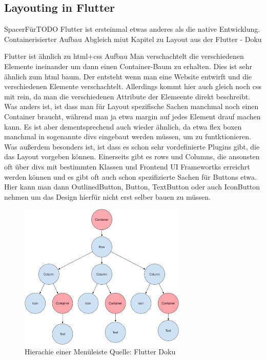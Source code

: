 \subsection{Layouting in Flutter}
SpacerFürTODO
Flutter ist ersteinmal etwas anderes als die native Entwicklung. 
Containerisierter Aufbau Abgleich miut Kapitel zu Layout aus der Flutter - Doku

Flutter ist ähnlich zu html+css Aufbau Man verschachtelt die verschiedenen Elemente ineinander um dann einen Container-Baum zu erhalten.
Dies ist sehr ähnlich zum html baum. Der entsteht wenn man eine Website entwirft und die verschiedenen Elemente verschachtelt. 
Allerdings kommt hier auch gleich noch css mit rein, da man die verschiedenen Attribute der Elemeente direkt beschreibt.
Was anders ist, ist dass man für Layout spezifische Sachen manchmal noch einen Container braucht, während man ja etwa margin auf jedes Element drauf machen kann. Es ist aber dementsprechend auch wieder ähnlich, da etwa flex boxen manchmal in sogenannte divs eingebaut werden müssen, um zu funtktionieren. Was außerdem besonders ist, ist dass es schon sehr vordefinierte Plugins gibt, die das Layout vorgeben können. Einerseits gibt es rows und Columns, die ansonsten oft über divs mit bestimmten Klassen und Frontend UI Framewortks erreichrt werden können und es gibt oft auch schon spezifizierte Sachen für Buttons etwa. Hier kann man dann OutlinedButton, Button, TextButton oder auch IconButton nehmen um das Design hierfür nicht erst selber bauen zu müssen.

\begin{figure}[ht]
  \centering
  \includegraphics[height=7cm,keepaspectratio]{images/sample-flutter-layout.png} 
  \caption{Hierachie einer Menüleiste Quelle: Flutter Doku}
  \label{fig:flutter_layout_tree}
\end{figure}

